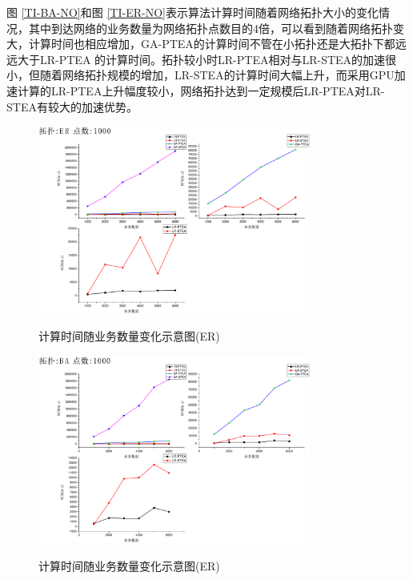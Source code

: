 图 \ref{TI-BA-NO}和图 \ref{TI-ER-NO}表示算法计算时间随着网络拓扑大小的变化情况，其中到达网络的业务数量为网络拓扑点数目的4倍，可以看到随着网络拓扑变大，计算时间也相应增加，GA-PTEA的计算时间不管在小拓扑还是大拓扑下都远远大于LR-PTEA 的计算时间。拓扑较小时LR-PTEA相对与LR-STEA的加速很小，但随着网络拓扑规模的增加，LR-STEA的计算时间大幅上升，而采用GPU加速计算的LR-PTEA上升幅度较小，网络拓扑达到一定规模后LR-PTEA对LR-STEA有较大的加速优势。
\begin{figure}
\setlength{\abovecaptionskip}{-0.5cm}
\begin{center}
{\includegraphics[width=0.8\textwidth]{figures/TI-ER-TA-1000.pdf}}
\end{center}
\caption{{\footnotesize{计算时间随业务数量变化示意图(ER)}}}
\label{TI-ER-TA-1000}
\end{figure}
\begin{figure} 
\setlength{\abovecaptionskip}{-0.5cm}
\begin{center}
{\includegraphics[width=0.8\textwidth]{figures/TI-BA-TA-1000.pdf}}
\end{center}
\caption{{\footnotesize{计算时间随业务数量变化示意图(ER)}}}
\label{TI-BA-TA-1000}
\end{figure}
